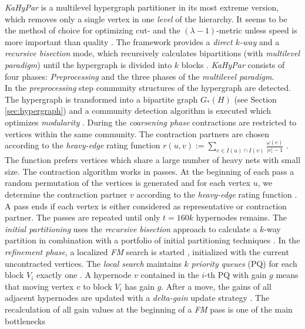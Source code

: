 \emph{KaHyPar} is a multilevel hypergraph partitioner in its most extreme version, which
removes only a single vertex in one \emph{level} of the hierarchy. It seems to be the method
of choice for optimizing cut- and the $(\lambda - 1)$-metric unless speed is more important than
quality \cite{heuer2017improving}. The framework provides a \emph{direct $k$-way} \cite{akhremtsev2017engineering} 
and a \emph{recursive bisection} mode, which recursively calculates bipartitions 
(with \emph{multilevel paradigm}) until the hypergraph is divided into $k$ blocks 
\cite{schlag2016k}. \emph{KaHyPar} consists of four phases: \emph{Preprocessing}
and the three phases of the \emph{multilevel paradigm}. \\
In the \emph{preprocessing} step community structures of the hypergraph are detected. The
hypergraph is transformed into a bipartite graph $G_*(H)$ (see Section \ref{sec:hypergraph}) and
a community detection algorithm is executed which optimizes \emph{modularity} \cite{fortunato2010community,
heuer2017improving}. During the \emph{coarsening phase} contractions are restricted to vertices within the same 
community. The contraction partners are chosen according to the \emph{heavy-edge} rating function
$r(u,v) := \sum_{e \in I(u) \cap I(v)} \frac{\omega(e)}{|e|-1}$ \cite{karypis1999multilevel}. The
function prefers vertices which share a large number of heavy nets with small size. The contraction
algorithm works in passes. At the beginning of each pass a random permutation of the vertices 
is generated and for each vertex $u$, we determine the contraction partner $v$ according
to the \emph{heavy-edge} rating function \cite{schlag2016k}. A pass ends if each vertex is either
considered as representative or contraction partner. The passes are repeated until only
$t = 160k$ hypernodes remains.
The \emph{initial partitioning} uses the \emph{recursive bisection} approach to calculate
a $k$-way partition in combination with a portfolio of initial partitioning techniques 
\cite{heuer2015engineering}. In the \emph{refinement phase}, a localized \emph{FM} search is started \cite{fiduccia1988linear},
initialized with the current uncontracted vertices. The \emph{local search} maintains $k$ \emph{priority
queues} (PQ) for each block $V_i$ exactly one \cite{akhremtsev2017engineering}. A hypernode $v$ contained in 
the $i$-th PQ with gain $g$ means that moving vertex $v$ to block $V_i$ has gain $g$. After a move,
the gains of all adjacent hypernodes are updated with a \emph{delta-gain} update strategy \cite{papa2007hypergraph}.
The recalculation of all gain values at the beginning of a \emph{FM} pass is one of the main bottlenecks
